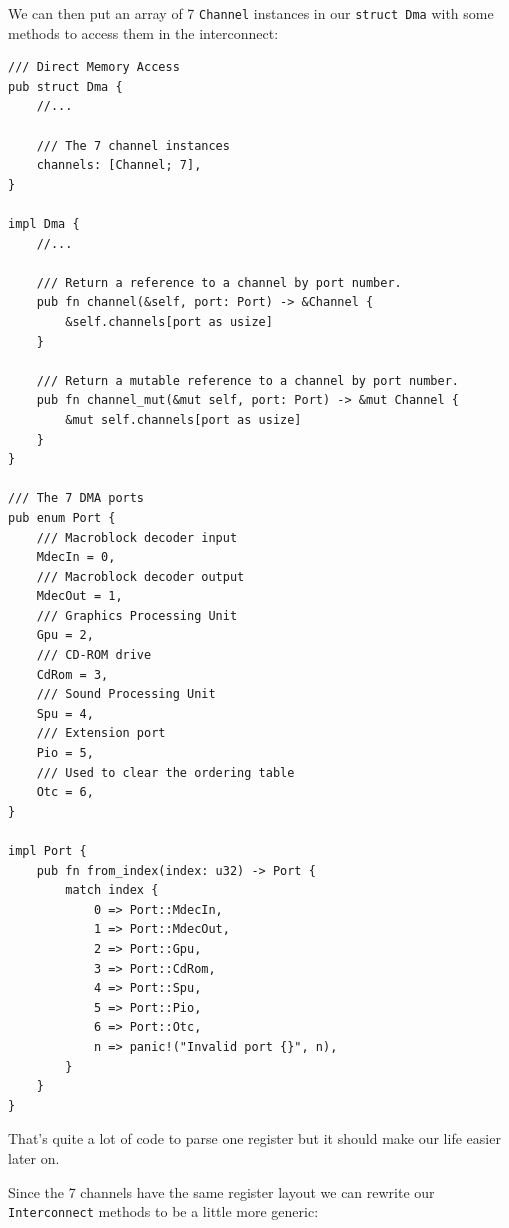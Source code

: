 \documentclass[a4paper]{article}
\newcommand{\code}[1] {\texttt{#1}}
\begin{document}
We can then put an array of 7 \code{Channel} instances in our
\code{struct Dma} with some methods to access them in the
interconnect:

\begin{lstlisting}
/// Direct Memory Access
pub struct Dma {
    //...

    /// The 7 channel instances
    channels: [Channel; 7],
}

impl Dma {
    //...

    /// Return a reference to a channel by port number.
    pub fn channel(&self, port: Port) -> &Channel {
        &self.channels[port as usize]
    }

    /// Return a mutable reference to a channel by port number.
    pub fn channel_mut(&mut self, port: Port) -> &mut Channel {
        &mut self.channels[port as usize]
    }
}

/// The 7 DMA ports
pub enum Port {
    /// Macroblock decoder input
    MdecIn = 0,
    /// Macroblock decoder output
    MdecOut = 1,
    /// Graphics Processing Unit
    Gpu = 2,
    /// CD-ROM drive
    CdRom = 3,
    /// Sound Processing Unit
    Spu = 4,
    /// Extension port
    Pio = 5,
    /// Used to clear the ordering table
    Otc = 6,
}

impl Port {
    pub fn from_index(index: u32) -> Port {
        match index {
            0 => Port::MdecIn,
            1 => Port::MdecOut,
            2 => Port::Gpu,
            3 => Port::CdRom,
            4 => Port::Spu,
            5 => Port::Pio,
            6 => Port::Otc,
            n => panic!("Invalid port {}", n),
        }
    }
}
\end{lstlisting}

That's quite a lot of code to parse one register but it should make
our life easier later on.

Since the 7 channels have the same register layout we can rewrite our
\code{Interconnect} methods to be a little more generic:
\end{document}
